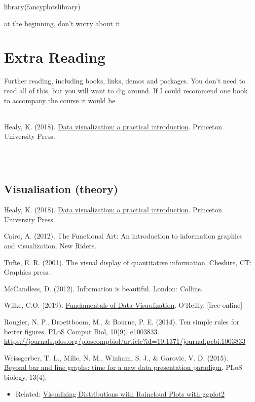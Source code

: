\documentclass[
]{book}
\providecommand{\tightlist}{%
  \setlength{\itemsep}{0pt}\setlength{\parskip}{0pt}}
\newenvironment{info}
    {
    \hline\\
    }
    { 
    \\\\\hline
    }
\begin{document}
library(fancyplotslibrary)

at the beginning, don't worry about it

\hypertarget{extra-reading}{%
\chapter{Extra Reading}\label{extra-reading}}

Further reading, including books, links, demos and packages. You don't need to read all of this, but you will want to dig around. If I could recommend one book to accompany the course it would be

\begin{info}
Healy, K. (2018). \href{https://socviz.co/}{Data visualization: a
practical introduction}. Princeton University Press.
\end{info}

\hypertarget{visualisation-theory}{%
\section{Visualisation (theory)}\label{visualisation-theory}}

Healy, K. (2018). \href{https://socviz.co/}{Data visualization: a practical introduction}. Princeton University Press.

Cairo, A. (2012). The Functional Art: An introduction to information graphics and visualization. New Riders.

Tufte, E. R. (2001). The visual display of quantitative information. Cheshire, CT: Graphics press.

McCandless, D. (2012). Information is beautiful. London: Collins.

Wilke, C.O. (2019). \href{https://clauswilke.com/dataviz/index.html}{Fundamentals of Data Visualization}. O'Reilly. {[}free online{]}

Rougier, N. P., Droettboom, M., \& Bourne, P. E. (2014). Ten simple rules for better figures. PLoS Comput Biol, 10(9), e1003833. \url{https://journals.plos.org/ploscompbiol/article?id=10.1371/journal.pcbi.1003833}

Weissgerber, T. L., Milic, N. M., Winham, S. J., \& Garovic, V. D. (2015). \href{https://journals.plos.org/plosbiology/article?id=10.1371/journal.pbio.1002128}{Beyond bar and line graphs: time for a new data presentation paradigm}. PLoS biology, 13(4).

\begin{itemize}
\tightlist
\item
  Related: \href{https://www.cedricscherer.com/2021/06/06/visualizing-distributions-with-raincloud-plots-with-ggplot2/}{Visualizing Distributions with Raincloud Plots with ggplot2}
\end{itemize}
\end{document}
